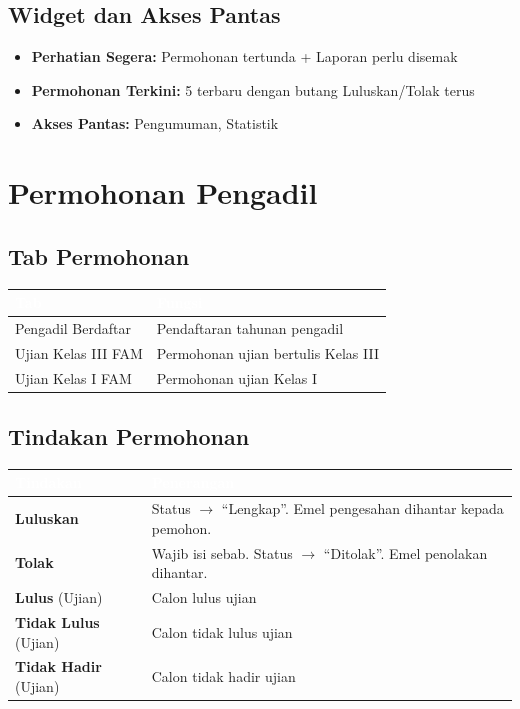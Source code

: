 \documentclass[12pt,a4paper]{report}
\begin{document}
\subsection{Widget dan Akses Pantas}
\begin{itemize}[label=\textcolor{pbnpblue}{\faChevronRight}]
  \item \textbf{Perhatian Segera:} Permohonan tertunda + Laporan perlu disemak
  \item \textbf{Permohonan Terkini:} 5 terbaru dengan butang Luluskan/Tolak terus
  \item \textbf{Akses Pantas:} Pengumuman, Statistik
\end{itemize}

\section{Permohonan Pengadil}

\subsection{Tab Permohonan}
\begin{table}[H]
\centering
{}
\begin{tabularx}{\textwidth}{l X}
\toprule
\rowcolor{tableheader}
\textcolor{white}{\textbf{Tab}} & \textcolor{white}{\textbf{Fungsi}} \\
\midrule
Pengadil Berdaftar & Pendaftaran tahunan pengadil \\
Ujian Kelas III FAM & Permohonan ujian bertulis Kelas III \\
Ujian Kelas I FAM & Permohonan ujian Kelas I \\
\bottomrule
\end{tabularx}
\end{table}

\subsection{Tindakan Permohonan}

\begin{table}[H]
\centering
{}
\begin{tabularx}{\textwidth}{l X}
\toprule
\rowcolor{tableheader}
\textcolor{white}{\textbf{Tindakan}} & \textcolor{white}{\textbf{Penerangan}} \\
\midrule
\textcolor{successgreen}{\textbf{Luluskan}} & Status $\rightarrow$ ``Lengkap''. Emel pengesahan dihantar kepada pemohon. \\
\textcolor{dangered}{\textbf{Tolak}} & Wajib isi sebab. Status $\rightarrow$ ``Ditolak''. Emel penolakan dihantar. \\
\textcolor{primaryblue}{\textbf{Lulus}} (Ujian) & Calon lulus ujian \\
\textcolor{dangered}{\textbf{Tidak Lulus}} (Ujian) & Calon tidak lulus ujian \\
\textcolor{warningyellow}{\textbf{Tidak Hadir}} (Ujian) & Calon tidak hadir ujian \\
\bottomrule
\end{tabularx}
\end{table}
\end{document}
